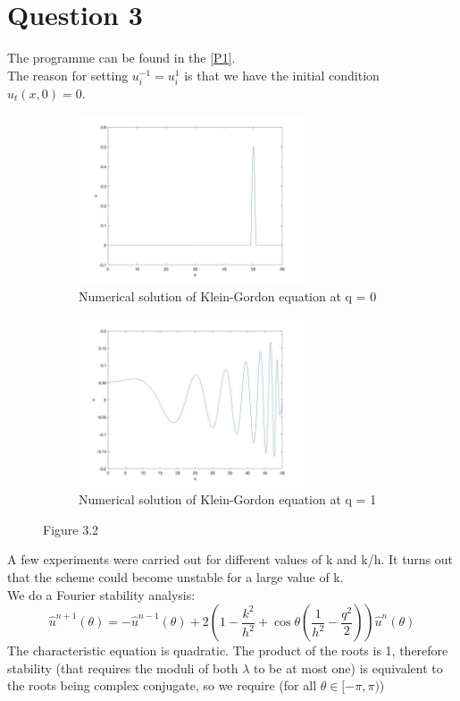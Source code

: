 \documentclass[a4paper,11pt]{article}
\begin{document}
\section{Question 3}
The programme can be found in the \ref{P1}.\\
The reason for setting $u_i^{-1} = u_i^{1}$ is that we have the initial condition $u_t(x,0) = 0$. 
\begin{figure}[H]
 \begin{subfigure}{0.5\textwidth}
 \includegraphics[width = \linewidth, height =5cm]{Q3.jpg}
 \caption{Numerical solution of Klein-Gordon  equation at q = 0}
 \label{Q3}
 \end{subfigure}
  \begin{subfigure}{0.5\textwidth}
 \includegraphics[width = \linewidth, height =5cm]{Q3(c).jpg}
 \caption{Numerical solution of Klein-Gordon equation at q = 1}
 \label{Q3(1)}
 \end{subfigure}
 \caption{Figure 3.2}
\end{figure} 
A few experiments were carried out for different values of k and k/h. It turns out that the scheme could become unstable for a large value of k. \\
We do a Fourier stability analysis: 
$$\hat{u}^{n+1}(\theta) = -\hat{u}^{n-1}(\theta) + 2\left(1-\frac{k^2}{h^2}+\cos\theta\left(\frac{1}{h^2}-\frac{q^2}{2}\right)\right)\hat{u}^{n}(\theta)$$
The characteristic equation is quadratic. The product of the roots is 1, therefore stability (that requires the moduli of both $\lambda$ to be at most one) is equivalent to the roots being complex conjugate, so we require (for all $\theta \in [-\pi, \pi)$)
\end{document}
